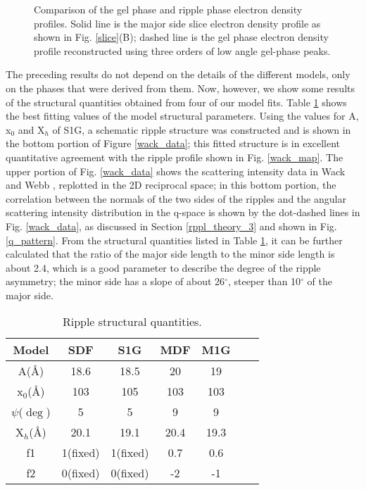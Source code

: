 \begin{figure}
\begin{center}
\leavevmode
{}
\end{center}
\caption{Comparison of the gel phase and ripple phase electron density
profiles. Solid line is the major side slice electron density profile
as shown in Fig. \ref{slice}(B);
dashed line is the gel phase electron density
profile reconstructed using three orders of low angle gel-phase peaks.
\label{gel_rppl}}
\end{figure}

The preceding results do not depend on the details of the different
models, only on the phases that were derived from them. Now, however,
we show some results of the structural quantities obtained from four of
our model fits. Table \ref{parameter} shows the best fitting values
of the model structural parameters. Using the values for A, x$_0$ and
X$_h$ of S1G, a schematic ripple structure was constructed and is shown
in the bottom portion of Figure \ref{wack_data}; this fitted structure
is in excellent quantitative agreement with the ripple profile shown 
in Fig. \ref{wack_map}. The upper portion of 
Fig. \ref{wack_data} shows the scattering intensity data in Wack and
Webb \cite{Wac89a}, replotted in the 2D reciprocal space; in this bottom 
portion, the correlation between the normals of the two 
sides of the ripples and the angular scattering intensity distribution 
in the q-space is shown by the dot-dashed lines in Fig. \ref{wack_data}, 
as discussed in Section \ref{rppl_theory_3} and shown in Fig. \ref{q_pattern}.
From the structural quantities listed in Table \ref{parameter}, it can be
further calculated that the ratio of the major side length to the 
minor side length is about 2.4, which is a good parameter 
to describe the degree of the ripple asymmetry; the minor side
has a slope of about 26$^{\circ}$, steeper than 10$^{\circ}$ of the major side. 

\begin{table}
\caption{Ripple structural quantities.
\label{parameter}}
\vspace{6pt}
\tabcolsep=0.35in
\begin{tabular}{ccccccc} \hline 
Model & SDF & S1G & MDF & M1G \\ \hline
A(\AA) & 18.6 & 18.5 & 20  & 19 \\
x$_0$(\AA) & 103 & 105 & 103 & 103 \\
$\psi$($\deg$) & 5 & 5 & 9 & 9 \\
X$_h$(\AA) & 20.1 & 19.1 & 20.4 & 19.3 \\
f1 & 1(fixed) & 1(fixed) & 0.7 & 0.6 \\
f2 & 0(fixed) & 0(fixed) & -2 & -1 \\ \hline
\end{tabular}
\end{table}

